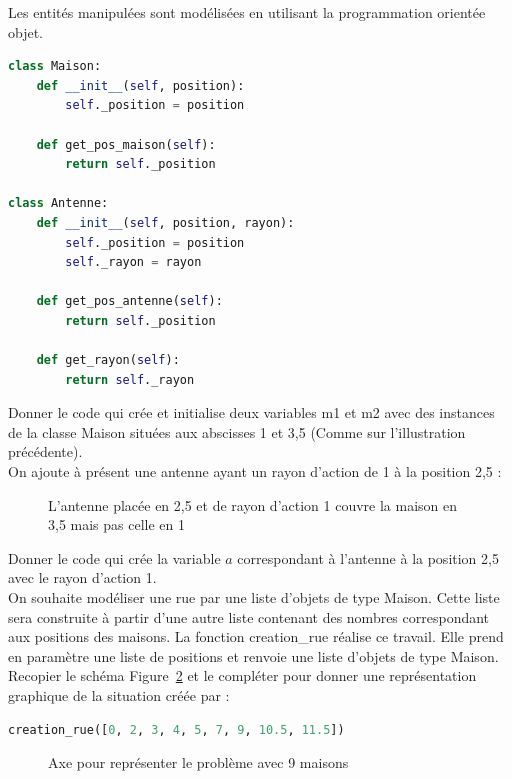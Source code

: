 \documentclass[a4paper, noanswers, addpoints, 12pt]{exam}
\begin{document}
\begin{questions}
Les entités manipulées sont modélisées en utilisant la programmation orientée objet.
\begin{lstlisting}[language=Python]
class Maison:
    def __init__(self, position):
        self._position = position
    
    def get_pos_maison(self):
        return self._position

class Antenne:
    def __init__(self, position, rayon):
        self._position = position
        self._rayon = rayon

    def get_pos_antenne(self):
        return self._position

    def get_rayon(self):
        return self._rayon
\end{lstlisting}

\question[2] Donner le code qui crée et initialise deux variables m1 et m2 avec des instances de la classe Maison situées aux abscisses 1 et 3,5 (Comme sur l'illustration précédente).\\

\hspace{-1cm}On ajoute à présent une antenne ayant un rayon d'action de 1 à la position 2,5 :

\begin{figure}[h]
    \centering
    
    \caption{L'antenne placée en 2,5 et de rayon d'action 1 couvre la maison en 3,5 mais pas celle en 1}
    \label{fig:exemple2}
\end{figure}

\question[1] Donner le code qui crée la variable $a$ correspondant à l'antenne à la position 2,5
avec le rayon d'action 1.\\

\pagebreak
On souhaite modéliser une rue par une liste d'objets de type Maison. Cette liste sera construite à partir d'une autre liste contenant des nombres correspondant aux positions des maisons. La fonction creation\_rue réalise ce travail. Elle prend en paramètre une liste de positions et renvoie une liste d'objets de type Maison.\\

\question[1] Recopier le schéma Figure~\ref{fig:Q4} et le compléter pour donner une représentation graphique de la situation créée par :
\begin{lstlisting}[language=Python]
creation_rue([0, 2, 3, 4, 5, 7, 9, 10.5, 11.5])
\end{lstlisting}
\vfill
\begin{figure}[h]
    \centering
    
    \caption{Axe pour représenter le problème avec 9 maisons}
    \label{fig:Q4}
\end{figure}


\end{questions}
\end{document}
